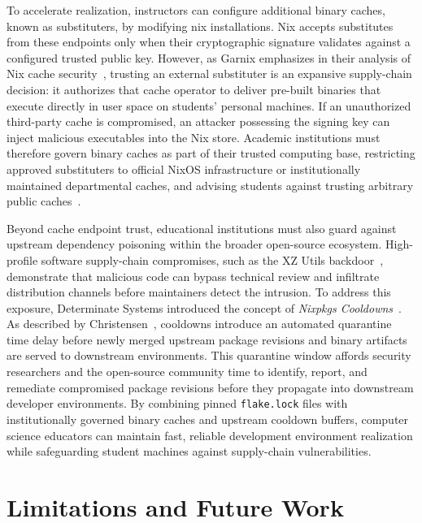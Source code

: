 To accelerate realization, instructors can configure additional binary caches, known
as substituters, by modifying nix installations. Nix accepts substitutes from these
endpoints only when their cryptographic signature validates against a configured trusted
public key. However, as Garnix emphasizes in their analysis of Nix cache security~\cite{GarnixBlogStop},
trusting an external substituter is an expansive supply-chain decision: it authorizes
that cache operator to deliver pre-built binaries that execute directly in user space
on students' personal machines. If an unauthorized third-party cache is compromised,
an attacker possessing the signing key can inject malicious executables into the
Nix store. Academic institutions must therefore govern binary caches as part of their
trusted computing base, restricting approved substituters to official NixOS
infrastructure or institutionally maintained departmental caches, and advising students
against trusting arbitrary public caches~\cite{dolstraNixSafePolicyFree}.

Beyond cache endpoint trust, educational institutions must also guard against
upstream dependency poisoning within the broader open-source ecosystem. High-profile
software supply-chain compromises, such as the XZ Utils backdoor~\cite{przymusWolvesRepositorySoftware2025},
demonstrate that malicious code can bypass technical review and infiltrate distribution
channels before maintainers detect the intrusion. To address this exposure, Determinate
Systems introduced the concept of \emph{Nixpkgs Cooldowns}~\cite{christensenIntroducingNixpkgsCooldowns2026}.
As described by Christensen~\cite{christensenIntroducingNixpkgsCooldowns2026},
cooldowns introduce an automated quarantine time delay before newly merged
upstream package revisions and binary artifacts are served to downstream
environments. This quarantine window affords security researchers and the open-source
community time to identify, report, and remediate compromised package revisions before
they propagate into downstream developer environments. By combining pinned
\texttt{flake.lock} files with institutionally governed binary caches and upstream
cooldown buffers, computer science educators can maintain fast, reliable development
environment realization while safeguarding student machines against supply-chain vulnerabilities.

\section{Limitations and Future Work}

